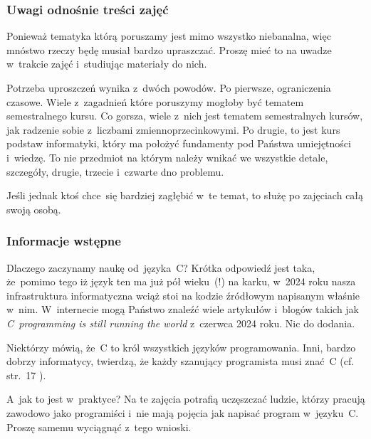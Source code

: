 \documentclass[10pt,t]{beamer}
\begin{document}
\begin{frame}
  \frametitle{Uwagi odnośnie treści zajęć}


  Ponieważ tematyka którą poruszamy jest mimo wszystko niebanalna, więc
  mnóstwo rzeczy będę musiał bardzo \alert{upraszczać}. Proszę mieć to na
  uwadze w~trakcie zajęć i~studiując materiały do nich.

  Potrzeba uproszczeń wynika z~dwóch powodów. Po pierwsze, ograniczenia
  czasowe. Wiele z~zagadnień które poruszymy mogłoby być tematem
  semestralnego kursu. Co gorsza, wiele z~nich \alert{jest} tematem
  semestralnych kursów, jak radzenie sobie z~liczbami zmiennoprzecinkowymi.
  Po drugie, to jest kurs \alert{podstaw} informatyki, który ma położyć
  fundamenty pod Państwa umiejętności i~wiedzę. To nie przedmiot na którym
  należy wnikać we wszystkie detale, szczegóły, drugie, trzecie i~czwarte
  dno problemu.

  Jeśli jednak ktoś chce~się bardziej zagłębić w~te temat, to służę po
  zajęciach całą swoją osobą.

\end{frame}





\begin{frame}
  \frametitle{Informacje wstępne}


  Dlaczego zaczynamy naukę od~języka~C? Krótka odpowiedź jest taka,
  że~pomimo tego iż język ten ma już pół wieku~(!) na karku, w~2024 roku
  nasza infrastruktura informatyczna wciąż stoi na kodzie źródłowym
  napisanym właśnie w~nim. W~internecie mogą Państwo znaleźć wiele
  artykułów i~blogów takich jak
  {\textit{C~programming is still running the world}}
  \parencite{Scott-C-programming-is-still-ETC-Ver-2024} z~czerwca 2024 roku.
  Nic do dodania.

  Niektórzy mówią, że~C to król wszystkich języków programowania.
  Inni, bardzo dobrzy informatycy, twierdzą, że każdy szanujący
  programista musi znać~C (cf. str.~17
  \parencite{Hoey-Programowanie-w-asemblerze-x64-ETC-Pub-2024}).

  A~jak to jest w~praktyce? Na te zajęcia potrafią uczęszczać ludzie,
  którzy pracują zawodowo jako programiści i~nie mają pojęcia jak napisać
  program w~języku~C. Proszę samemu wyciągnąć z~tego wnioski.

\end{frame}
\end{document}
